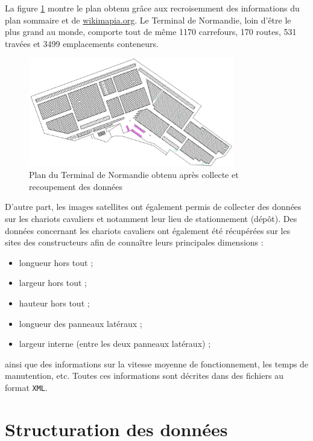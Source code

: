 La figure \ref{fig:planTerminalComplet} montre le plan obtenu grâce aux recroisemment des informations du plan sommaire et de \href{http://wikimapia.org/\#lat=49.4694697\&lon=0.1676486\&z=16\&l=2\&m=b}{wikimapia.org}. Le Terminal de Normandie, loin d'être le plus grand au monde, comporte tout de même 1170 carrefours, 170 routes, 531 travées et 3499 emplacements conteneurs.

\begin{figure}[ht]
\centering
 \includegraphics[width=0.8\textwidth]{./chapitres/simulation/planTerminalComplet.jpg}
  \caption{Plan du Terminal de Normandie obtenu après collecte et recoupement des données}
  \label{fig:planTerminalComplet}
\end{figure}

D'autre part, les images satellites ont également permis de collecter des données sur les chariots cavaliers et notamment leur lieu de stationnement (dépôt). Des données concernant les chariots
cavaliers ont également été récupérées sur les sites des constructeurs afin de connaître leurs principales dimensions :
\begin{itemize}
 \item longueur hors tout ;
 \item largeur hors tout ;
 \item hauteur hors tout ;
 \item longueur des panneaux latéraux ;
 \item largeur interne (entre les deux panneaux latéraux) ;
\end{itemize}

ainsi que des informations sur la vitesse moyenne de fonctionnement, les temps de manutention, etc. Toutes ces informations sont décrites dans des fichiers au format \verb!XML!.

\section{Structuration des données}\label{sec:structurationDonnees}


